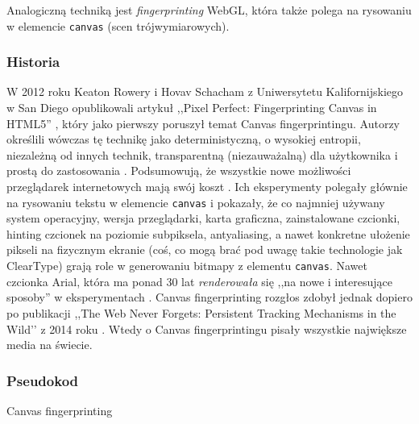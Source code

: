 Analogiczną techniką jest \emph{fingerprinting} WebGL, która także polega na
rysowaniu w elemencie \texttt{canvas} (scen trójwymiarowych).

\subsubsection{Historia}
W 2012 roku Keaton Rowery i Hovav Schacham z Uniwersytetu Kalifornijskiego w San
Diego opublikowali artykuł ,,Pixel Perfect: Fingerprinting Canvas in HTML5''
\cite{mowery2012pixel}, który jako pierwszy poruszył temat Canvas
fingerprintingu. Autorzy określili wówczas tę technikę jako deterministyczną, o
wysokiej entropii, niezależną od innych technik, transparentną (niezauważalną)
dla użytkownika i prostą do zastosowania \cite[s. 1]{mowery2012pixel}.
Podsumowują, że wszystkie nowe możliwości przeglądarek internetowych mają swój
koszt \cite[s. 3]{mowery2012pixel}. Ich eksperymenty polegały głównie na
rysowaniu tekstu w elemencie \texttt{canvas} i pokazały, że co najmniej używany
system operacyjny, wersja przeglądarki, karta graficzna, zainstalowane czcionki,
hinting czcionek na poziomie subpiksela, antyaliasing, a nawet konkretne
ułożenie pikseli na fizycznym ekranie (coś, co mogą brać pod uwagę takie
technologie jak ClearType) grają role w generowaniu bitmapy z elementu
\texttt{canvas}. Nawet czcionka Arial, która ma ponad 30 lat \emph{renderowała}
się ,,na nowe i interesujące sposoby'' w eksperymentach \cite[s.
6]{mowery2012pixel}. Canvas fingerprinting rozgłos zdobył jednak dopiero po
publikacji ,,The Web Never Forgets: Persistent Tracking Mechanisms in the Wild’’
z 2014 roku \cite{acar2014web}. Wtedy o Canvas fingerprintingu pisały wszystkie
największe media na świecie.

\subsubsection{Pseudokod}
\begin{algorithm}[H]
	\SetAlgoVlined
	\BlankLine
	\BlankLine
	\;
	\caption{Canvas fingerprinting}
\end{algorithm}

